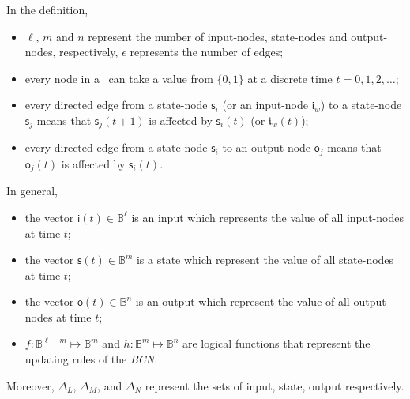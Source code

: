 In the definition, %
\begin{itemize}
	\item $\ell$, $m$ and $n$ represent the number of input-nodes, state-nodes and output-nodes, respectively, $\epsilon$ represents the number of edges;
          \item every node in a \BCN\ can take a value from $\{0,1\}$ at a discrete time $t=0, 1, 2,\ldots$;
	\item every directed edge from a state-node $\mathsf{s}_i$ (or an input-node $\mathsf{i}_w$) to a state-node $\mathsf{s}_j$ means that  $\mathsf{s}_j(t+1)$ is affected by $\mathsf{s}_i(t)$ (or $\mathfrak{i}_w(t)$);	
	\item every directed edge from a state-node $\mathsf{s}_i$ to an output-node $\mathsf{o}_j$ means that   $\mathsf{o}_j(t)$  is affected by $\mathsf{s}_i(t)$.  
	\end{itemize}
In general, 
	\begin{itemize}
	\item the vector $\mathsf{i}(t)\in \mathbb{B}^{\ell}$ is an input which represents the value of all input-nodes at time $t$; 	
	\item the vector $\mathsf{s}(t)\in \mathbb{B}^m$ is a state which represent the value of all state-nodes at time $t$; 	
	\item the vector $\mathsf{o}(t)\in \mathbb{B}^n$ is an output which represent the value of all output-nodes at time $t$;  
	\item $f:\mathbb{B}^{\ell +m}\mapsto \mathbb{B}^m$ and $h:\mathbb{B}^m\mapsto \mathbb{B}^n$ are logical functions that represent the updating rules of the {\em BCN}.
\end{itemize}

Moreover, $\Delta_L $, $\Delta_M$, and $\Delta_N$ represent the sets of input, state, output respectively. 

